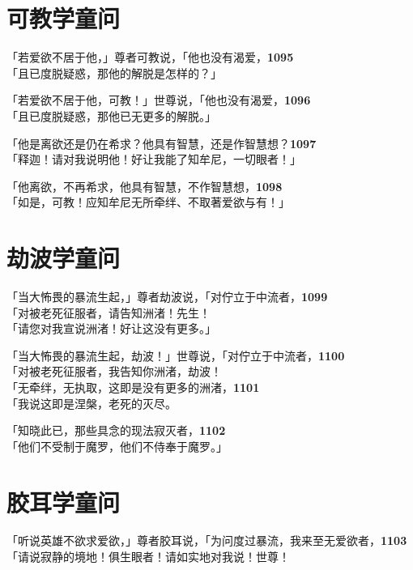 \section{可教学童问}

「若爱欲不居于他，」尊者可教说，「他也没有渴爱，\hfill{\grayfootnotesize \textbf{1095}} \\
「且已度脱疑惑，那他的解脱是怎样的？」


「若爱欲不居于他，可教！」世尊说，「他也没有渴爱，\hfill{\grayfootnotesize \textbf{1096}} \\
「且已度脱疑惑，那他已无更多的解脱。」


「他是离欲还是仍在希求？他具有智慧，还是作智慧想？\hfill{\grayfootnotesize \textbf{1097}} \\
「释迦！请对我说明他！好让我能了知牟尼，一切眼者！」


「他离欲，不再希求，他具有智慧，不作智慧想，\hfill{\grayfootnotesize \textbf{1098}} \\
「如是，可教！应知牟尼无所牵绊、不取著爱欲与有！」


\section{劫波学童问}

「当大怖畏的暴流生起，」尊者劫波说，「对佇立于中流者，\hfill{\grayfootnotesize \textbf{1099}} \\
「对被老死征服者，请告知洲渚！先生！\\
「请您对我宣说洲渚！好让这没有更多。」


「当大怖畏的暴流生起，劫波！」世尊说，「对佇立于中流者，\hfill{\grayfootnotesize \textbf{1100}} \\
「对被老死征服者，我告知你洲渚，劫波！\\


「无牵绊，无执取，这即是没有更多的洲渚，\hfill{\grayfootnotesize \textbf{1101}} \\
「我说这即是涅槃，老死的灭尽。


「知晓此已，那些具念的现法寂灭者，\hfill{\grayfootnotesize \textbf{1102}} \\
「他们不受制于魔罗，他们不侍奉于魔罗。」


\section{胶耳学童问}

「听说英雄不欲求爱欲，」尊者胶耳说，「为问度过暴流，我来至无爱欲者，\hfill{\grayfootnotesize \textbf{1103}} \\
「请说寂静的境地！俱生眼者！请如实地对我说！世尊！


